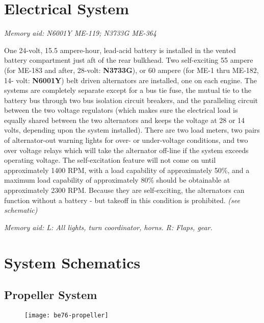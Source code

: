{\section{Electrical System}

\emph{Memory aid: N6001Y ME-119; N3733G ME-364}

One 24-volt, 15.5 ampere-hour, lead-acid battery is installed in the vented battery compartment just aft of the rear
bulkhead. Two self-exciting 55 ampere (for ME-183 and after, 28-volt: \textbf{N3733G}), or 60 ampere (for ME-1 thru ME-182, 14-
volt: \textbf{N6001Y}) belt driven alternators are installed, one on each engine. The systems are completely separate except for a bus
tie fuse, the mutual tie to the battery bus through two bus isolation circuit breakers, and the paralleling circuit
between the two voltage regulators (which makes sure the electrical load is equally shared between the two
alternators and keeps the voltage at 28 or 14 volts, depending upon the system installed). There are two load meters,
two pairs of alternator-out warning lights for over- or under-voltage conditions, and two over voltage relays which
will take the alternator off-line if the system exceeds operating voltage. The self-excitation feature will not come on
until approximately 1400 RPM, with a load capability of approximately 50\%, and a maximum load capability of
approximately 80\% should be obtainable at approximately 2300 RPM. Because they are self-exciting, the
alternators can function without a battery - but takeoff in this condition is prohibited.
\emph{(see schematic)}

\emph{Memory aid: L: All lights, turn coordinator, horns. R: Flaps, gear.}

\newpage

\section{System Schematics}

\subsection{Propeller System}

\begin{figure}[H]
\begin{center}
\texttt{[image: be76-propeller]}
\end{center}
\end{figure}

\newpage

}
